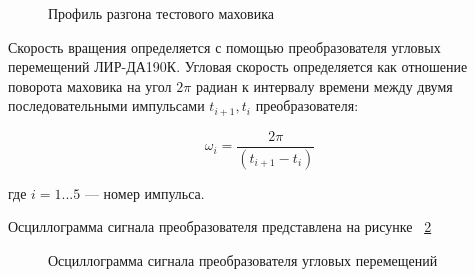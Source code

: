 \begin{figure}[!h] 
	\caption{Профиль разгона тестового маховика}
	\label{fig:flyweel_speed} 
\end{figure}



Скорость вращения определяется с помощью преобразователя угловых перемещений ЛИР-ДА190К. Угловая скорость определяется как отношение поворота маховика на угол $2\pi$ радиан к интервалу времени между двумя последовательными импульсами $t_{i+1}, t_i$ преобразователя: 

\begin{equation}
	\label{eq:flyweel_spd}
	\omega_i=\frac{2 \pi}{(t_{i+1}-t_i)}
\end{equation}

где \(i=1...5\) --- номер импульса.

Осциллограмма сигнала преобразователя представлена на рисунке ~\cref{fig:encoder}


\begin{figure}[!h] 
	\caption{Осциллограмма сигнала преобразователя угловых перемещений}
	\label{fig:encoder} 
\end{figure}

